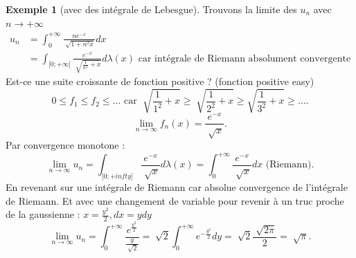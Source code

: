 \documentclass{article}
\theoremstyle{plain}%
\theoremstyle{definition}
\newtheorem{exmp}{Exemple}[section]
\theoremstyle{remark}
\begin{document}
    \begin{exmp}[avec des intégrale de Lebesgue]
        Trouvons la limite des $ u_n $ avec $ n \to +\infty  $ 
        \begin{align*}
            u_n &= \int_{0}^{+\infty } \frac{n e^{-x}}{\sqrt[]{1+n^2 x}} dx \\
            &= \int_{[0;+\infty [}^{}\frac{e^{-x}}{\sqrt[]{\frac{1}{n^2} + x}}d \lambda (x) \text{ car intégrale de Riemann absolument convergente}
        \end{align*}
        Est-ce une suite croissante de fonction positive ? (fonction positive easy) 
        \[
            0 \leq f_1 \leq f_2 \leq \dots \text{ car } \sqrt[]{\frac{1}{1^2} + x} \geq \sqrt[]{ \frac{1}{2^2} + x} \geq \sqrt{\frac{1}{3^2}+ x} \geq \dots
        .\]
        \[
            \lim_{n \to \infty} f_n(x) = \frac{e^{-x}}{\sqrt[]{x}}
        .\]
        Par convergence monotone : 
        \[
            \lim_{n \to \infty} u_n = \int_{[0;+infty[}^{} \frac{e^{-x}}{\sqrt[]{x}}d \lambda (x) = \int_{0}^{+ \infty } \frac{e^{-x}}{\sqrt[]{x}} dx \text{ (Riemann)}
        .\]
        En revenant sur une intégrale de Riemann car absolue convergence de l'intégrale de Riemann. Et avec une changement de variable pour revenir à un truc proche de la gaussienne : $ x=\frac{y^2}{2}, dx = y dy $ 
        \[
            \lim_{n \to \infty} u_n = \int_{0}^{+\infty } \frac{e^{\frac{y^2}{2}}}{\frac{y}{\sqrt[]{2}}} = \sqrt[]{2}\int_{0}^{+\infty } e^{-\frac{y^2}{2}}dy = \sqrt[]{2} \frac{\sqrt[]{2 \pi }}{2} = \sqrt[]{\pi }
        .\] 
    \end{exmp}
\end{document}
